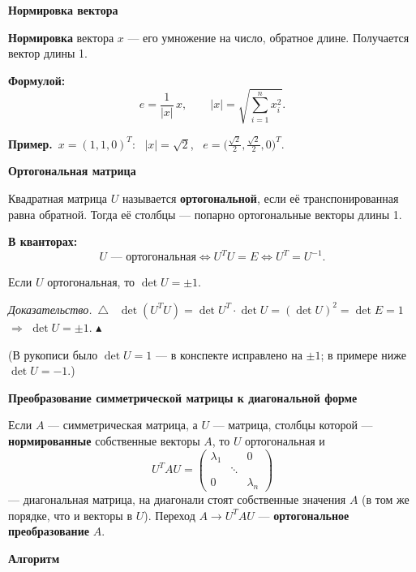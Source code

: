 \documentclass[a4paper,11pt]{article}
\newcommand{\kv}{\par\noindent\textbf{\textcolor{oprc!85!black}{В кванторах:}}}
\newcommand{\fm}{\par\noindent\textbf{\textcolor{oprc!85!black}{Формулой:}}}
\newcommand{\prim}{\par\smallskip\noindent\textbf{\textcolor{teoc!80!black}{Пример.}}\ }
\newenvironment{dok}
  {\par\smallskip\noindent\textit{Доказательство.}\ $\triangle$\ \ignorespaces}
  {\unskip\nobreak\hfill$\blacktriangle$\par\smallskip}
\newcommand{\podr}[1]{\par\needspace{8\baselineskip}\medskip
  {\large\bfseries\textcolor{oprc!80!black}{#1}}\par\nopagebreak\smallskip}
\begin{document}
\podr{Нормировка вектора}

\begin{opr}[нормировка]
\textbf{Нормировка} вектора $x$ --- его умножение на число, обратное длине. Получается вектор длины 1.
\fm
\[
  e = \frac{1}{|x|}\, x, \qquad |x| = \sqrt{\textstyle\sum_{i=1}^{n} x_i^2}.
\]
\end{opr}

\prim $x = (1, 1, 0)^T$: \ $|x| = \sqrt2$, \ $e = \bigl(\frac{\sqrt2}{2}, \frac{\sqrt2}{2}, 0\bigr)^T$.

\podr{Ортогональная матрица}

\begin{opr}
Квадратная матрица $U$ называется \textbf{ортогональной}, если её транспонированная равна обратной.
Тогда её столбцы --- попарно ортогональные векторы длины 1.
\kv
\[
  U \text{ --- ортогональная} \Leftrightarrow U^T U = E \Leftrightarrow U^T = U^{-1}.
\]
\end{opr}

\begin{teo}
Если $U$ ортогональная, то $\det U = \pm 1$.
\end{teo}

\begin{dok}
$\det(U^T U) = \det U^T \cdot \det U = (\det U)^2 = \det E = 1$ $\Rightarrow$ $\det U = \pm 1$.
\end{dok}

{\small\textcolor{zamc}{(В рукописи было $\det U = 1$ --- в конспекте исправлено на $\pm 1$; в примере ниже $\det U = -1$.)}}

\podr{Преобразование симметрической матрицы к диагональной форме}

\begin{teo}
Если $A$ --- симметрическая матрица, а $U$ --- матрица, столбцы которой --- \textbf{нормированные} собственные векторы $A$, то
$U$ ортогональная и
\[
  U^T A U = \begin{pmatrix} \lambda_1 & & 0 \\ & \ddots & \\ 0 & & \lambda_n \end{pmatrix}
\]
--- диагональная матрица, на диагонали стоят собственные значения $A$ (в том же порядке, что и векторы в $U$).
Переход $A \to U^T A U$ --- \textbf{ортогональное преобразование} $A$.
\end{teo}

\podr{Алгоритм}
\end{document}
